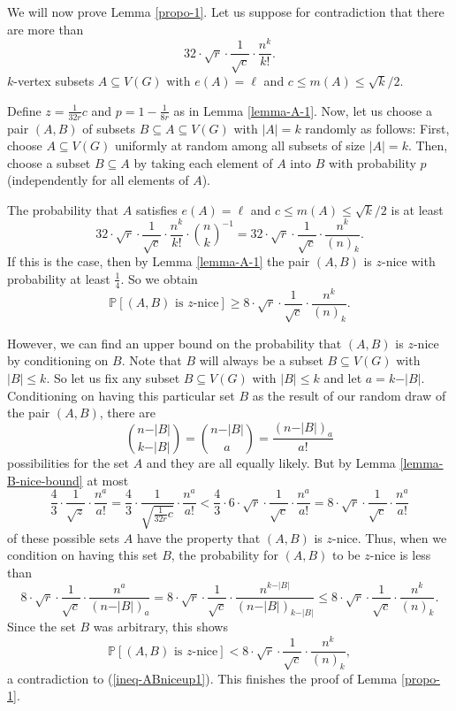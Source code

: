 \documentclass[11pt]{article}
\theoremstyle{definition}
\numberwithin{equation}{section}
\begin{document}
We will now prove Lemma \ref{propo-1}. Let us suppose for contradiction that there are more than
\[32\cdot\sqrt{r}\cdot \frac{1}{\sqrt{c}}\cdot \frac{n^k}{k!}.\]
$k$-vertex subsets $A\subseteq V(G)$ with $e(A)=\ell$ and $c\leq m(A)\leq \sqrt{k}/2$. 

Define $z=\frac{1}{32r}c$ and $p=1-\frac{1}{8r}$ as in Lemma \ref{lemma-A-1}. Now, let us choose a pair $(A,B)$ of subsets $B\subseteq A\subseteq V(G)$ with $\vert A\vert=k$ randomly as follows: First, choose $A\subseteq V(G)$ uniformly at random among all subsets of size $\vert A\vert=k$. Then, choose a subset $B\subseteq A$ by taking each element of $A$ into $B$ with probability $p$ (independently for all elements of $A$).

The probability that $A$ satisfies $e(A)=\ell$ and $c\leq m(A)\leq \sqrt{k}/2$ is at least
\[32\cdot\sqrt{r}\cdot \frac{1}{\sqrt{c}}\cdot \frac{n^k}{k!}\cdot {n\choose k}^{-1}=32\cdot\sqrt{r}\cdot \frac{1}{\sqrt{c}}\cdot\frac{n^k}{(n)_k}.\]
If this is the case, then by Lemma \ref{lemma-A-1} the pair $(A,B)$ is $z$-nice with probability at least $\frac{1}{4}$. So we obtain
\begin{equation}\label{ineq-ABniceup1}
\mathbb{P}[(A,B)\text{ is }z\text{-nice}]\geq 8\cdot\sqrt{r}\cdot \frac{1}{\sqrt{c}}\cdot\frac{n^k}{(n)_k}.
\end{equation}

However, we can find an upper bound on the probability that $(A,B)$ is $z$-nice by conditioning on $B$. Note that $B$ will always be a subset $B\subseteq V(G)$ with $\vert B\vert \leq k$. So let us fix any subset $B\subseteq V(G)$ with $\vert B\vert \leq k$ and let $a=k-\vert B\vert$. Conditioning on having this particular set $B$ as the result of our random draw of the pair $(A,B)$, there are
\[{n-\vert B\vert\choose k-\vert B\vert}={n-\vert B\vert\choose a}=\frac{(n-\vert B\vert)_a}{a!}\]
possibilities for the set $A$ and they are all equally likely. But by Lemma \ref{lemma-B-nice-bound} at most
\[\frac{4}{3}\cdot\frac{1}{\sqrt{z}}\cdot \frac{n^a}{a!}=\frac{4}{3}\cdot\frac{1}{\sqrt{\frac{1}{32r}c}}\cdot \frac{n^a}{a!}< \frac{4}{3}\cdot 6\cdot \sqrt{r}\cdot\frac{1}{\sqrt{c}}\cdot \frac{n^a}{a!}=8\cdot \sqrt{r}\cdot\frac{1}{\sqrt{c}}\cdot \frac{n^a}{a!}\]
of these possible sets $A$ have the property that $(A,B)$ is $z$-nice. Thus, when we condition on having this set $B$, the probability for $(A,B)$ to be $z$-nice is less than
\[8\cdot \sqrt{r}\cdot\frac{1}{\sqrt{c}}\cdot \frac{n^a}{(n-\vert B\vert)_a}=
8\cdot \sqrt{r}\cdot\frac{1}{\sqrt{c}}\cdot \frac{n^{k-\vert B\vert}}{(n-\vert B\vert)_{k-\vert B\vert}}\leq 8\cdot \sqrt{r}\cdot\frac{1}{\sqrt{c}}\cdot \frac{n^k}{(n)_k}.\]
Since the set $B$ was arbitrary, this shows
\[\mathbb{P}[(A,B)\text{ is }z\text{-nice}]<8\cdot \sqrt{r}\cdot\frac{1}{\sqrt{c}}\cdot \frac{n^k}{(n)_k},\]
a contradiction to (\ref{ineq-ABniceup1}). This finishes the proof of Lemma \ref{propo-1}.
\end{document}
